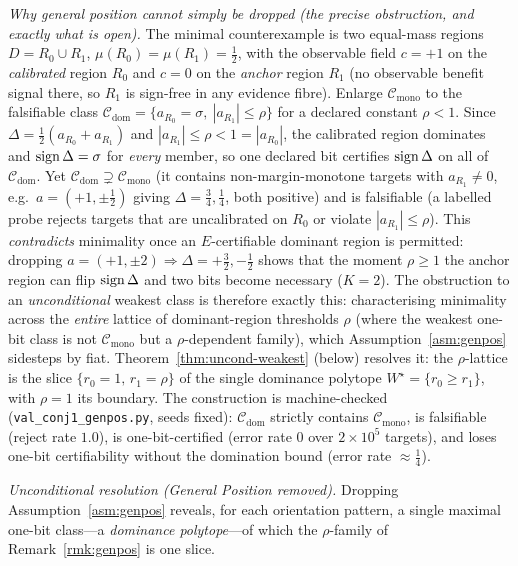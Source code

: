 \begin{remark}
\smallskip
\noindent\emph{Why general position cannot simply be dropped (the precise obstruction, and
exactly what is open).} The minimal counterexample is two equal-mass regions
$D=R_0\cup R_1$, $\mu(R_0)=\mu(R_1)=\tfrac12$, with the observable field $c=+1$ on the
\emph{calibrated} region $R_0$ and $c=0$ on the \emph{anchor} region $R_1$ (no observable benefit
signal there, so $R_1$ is sign-free in any evidence fibre). Enlarge $\mathcal C_{\mathrm{mono}}$ to
the falsifiable class $\mathcal C_{\mathrm{dom}}=\{a_{R_0}=\sigma,\ |a_{R_1}|\le\rho\}$ for a
declared constant $\rho<1$. Since $\Delta=\tfrac12(a_{R_0}+a_{R_1})$ and $|a_{R_1}|\le\rho<1=|a_{R_0}|$,
the calibrated region dominates and $\operatorname{sign}\Delta=\sigma$ for \emph{every} member, so one declared
bit certifies $\operatorname{sign}\Delta$ on all of $\mathcal C_{\mathrm{dom}}$. Yet $\mathcal C_{\mathrm{dom}}
\supsetneq\mathcal C_{\mathrm{mono}}$ (it contains non-margin-monotone targets with $a_{R_1}\neq0$,
e.g.\ $a=(+1,\pm\tfrac12)$ giving $\Delta=\tfrac34,\tfrac14$, both positive) and is falsifiable (a
labelled probe rejects targets that are uncalibrated on $R_0$ or violate $|a_{R_1}|\le\rho$). This
\emph{contradicts} minimality once an $E$-certifiable dominant region is permitted: dropping
$a=(+1,\pm2)\Rightarrow\Delta=+\tfrac32,-\tfrac12$ shows that the moment $\rho\ge1$ the anchor
region can flip $\operatorname{sign}\Delta$ and two bits become necessary ($K{=}2$). The obstruction to an
\emph{unconditional} weakest class is therefore exactly this: characterising minimality across the
\emph{entire} lattice of dominant-region thresholds $\rho$ (where the weakest one-bit class is not
$\mathcal C_{\mathrm{mono}}$ but a $\rho$-dependent family), which Assumption~\ref{asm:genpos}
sidesteps by fiat. Theorem~\ref{thm:uncond-weakest} (below) resolves it: the $\rho$-lattice is the
slice $\{r_0{=}1,\,r_1{=}\rho\}$ of the single dominance polytope $W^\star{=}\{r_0\ge r_1\}$, with
$\rho{=}1$ its boundary. The construction is machine-checked
(\texttt{val\_conj1\_genpos.py}, seeds fixed): $\mathcal C_{\mathrm{dom}}$ strictly contains
$\mathcal C_{\mathrm{mono}}$, is falsifiable (reject rate $1.0$), is one-bit-certified (error rate
$0$ over $2\times10^5$ targets), and loses one-bit certifiability without the domination bound
(error rate $\approx\tfrac14$).
\end{remark}

\smallskip
\noindent\emph{Unconditional resolution (General Position removed).}
Dropping Assumption~\ref{asm:genpos} reveals, for each orientation pattern, a single maximal one-bit
class---a \emph{dominance polytope}---of which the $\rho$-family of Remark~\ref{rmk:genpos} is one
slice.

